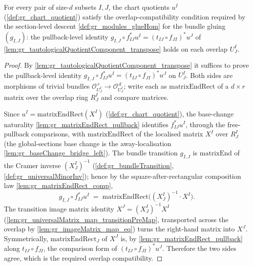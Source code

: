 \begin{lemma}\leanok
  \label{lem:gr_tautologicalQuotient_overlap}
  For every pair of size-\(d\) subsets \(I, J\), the chart quotients \(u^I\)
  (\cref{def:gr_chart_quotient}) satisfy the overlap-compatibility condition required by the
  section-level descent \cref{def:gr_modules_glueHom} for the bundle gluing \((g_{I,J})\):
  the pullback-level identity \(g_{I,J} \circ f_{IJ}^{*} u^I = (t_{IJ}\circ f_{JI})^{*} u^J\)
  of \cref{lem:gr_tautologicalQuotientComponent_transpose} holds on each overlap \(U^I_J\).
\end{lemma}
\begin{proof}
  By \cref{lem:gr_tautologicalQuotientComponent_transpose} it suffices to prove the
  pullback-level identity \(g_{I,J} \circ f_{IJ}^{*} u^I = (t_{IJ}\circ f_{JI})^{*} u^J\) on
  \(U^I_J\). Both sides are morphisms of trivial bundles \(\mathcal{O}_{U^I_J}^{\,r} \to
  \mathcal{O}_{U^I_J}^{\,d}\); write each as \(\mathrm{matrixEndRect}\) of a \(d \times r\)
  matrix over the overlap ring \(R^I_J\) and compare matrices.

  Since \(u^I = \mathrm{matrixEndRect}(X^I)\) (\cref{def:gr_chart_quotient}), the
  base-change naturality \cref{lem:gr_matrixEndRect_pullback} identifies \(f_{IJ}^{*} u^I\),
  through the free-pullback comparisons, with \(\mathrm{matrixEndRect}\) of the localised
  matrix \(X^I\) over \(R^I_J\) (the global-sections base change is the away-localisation
  \cref{lem:gr_baseChange_bridge_left}). The bundle transition \(g_{I,J}\) is
  \(\mathrm{matrixEnd}\) of the Cramer inverse \((X^I_J)^{-1}\)
  (\cref{def:gr_bundleTransition}, \cref{def:gr_universalMinorInv}); hence by the
  square-after-rectangular composition law \cref{lem:gr_matrixEndRect_comp},
  \[
    g_{I,J} \circ f_{IJ}^{*} u^I
      \;=\; \mathrm{matrixEndRect}\bigl((X^I_J)^{-1} \cdot X^I\bigr).
  \]
  The transition image matrix identity \(X^J = (X^I_J)^{-1} X^I\)
  (\cref{lem:gr_universalMatrix_map_transitionPreMap}, transported across the overlap by
  \cref{lem:gr_imageMatrix_map_eq}) turns the right-hand matrix into \(X^J\). Symmetrically,
  \(\mathrm{matrixEndRect}_J\) of \(X^J\) is, by \cref{lem:gr_matrixEndRect_pullback} along
  \(t_{IJ}\circ f_{JI}\), the comparison form of \((t_{IJ}\circ f_{JI})^{*} u^J\). Therefore
  the two sides agree, which is the required overlap compatibility.
\end{proof}

